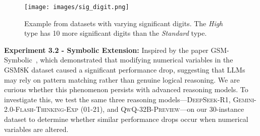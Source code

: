 {\begin{itemize}[topsep=5pt, leftmargin=1em]
\begin{figure}
    \centering
    \texttt{[image: images/sig\_digit.png]}
    \caption{Example from datasets with varying significant digits. The \textit{High} type has 10 more significant digits than the \textit{Standard} type.}
    \label{fig:exmaple_sig_digit}
\end{figure}

\textbf{\hypertarget{exp:3.2}{Experiment 3.2} - Symbolic Extension:} Inspired by the paper GSM-Symbolic~\cite{mirzadeh2024gsm}, which demonstrated that modifying numerical variables in the GSM8K dataset caused a significant performance drop, suggesting that LLMs may rely on pattern matching rather than genuine logical reasoning. We are curious whether this phenomenon persists with advanced reasoning models.
To investigate this, we test the same three reasoning models—\textsc{DeepSeek-R1}, \textsc{Gemini-2.0-Flash-Thinking-Exp (01-21)}, and \textsc{QwQ-32B-Preview}—on our 30-instance dataset to determine whether similar performance drops occur when numerical variables are altered.










\end{itemize}}
